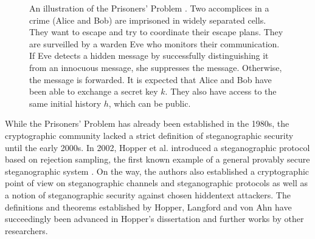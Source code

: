 \begin{figure}[htbp]
\centering
{}
\caption{
An illustration of the Prisoners' Problem \cite{Simmons1983}.
Two accomplices in a crime (Alice and Bob) are imprisoned in widely separated cells.
They want to escape and try to coordinate their escape plans.
They are surveilled by a warden Eve who monitors their communication.
If Eve detects a hidden message by successfully distinguishing it from an innocuous message, she suppresses the message.
Otherwise, the message is forwarded.
It is expected that Alice and Bob have been able to exchange a secret key $k$.
They also have access to the same initial history $h$, which can be public.
}
\label{fig:prisonersgame}
\end{figure}

While the Prisoners' Problem has already been established in the 1980s, the cryptographic community lacked a strict definition of steganographic security until the early 2000s.
In 2002, Hopper et al. introduced a steganographic protocol based on rejection sampling, the first known example of a general provably secure steganographic system \cite{HLA2002}.
On the way, the authors also established a cryptographic point of view on steganographic channels and steganographic protocols as well as a notion of steganographic security against chosen hiddentext attackers.
The definitions and theorems established by Hopper, Langford and von Ahn have succeedingly been advanced in Hopper's dissertation \cite{Hopper2004} and further works by other researchers.


